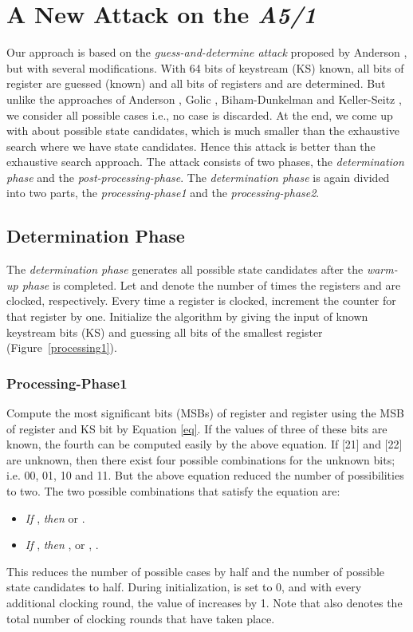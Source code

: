 \documentclass{llncs}
\begin{document}
\section{A New Attack on the \emph{A5/1}}
Our approach is based on the \emph{guess-and-determine attack} proposed by Anderson \cite{[And]}, but with several modifications. With 64 bits of keystream (KS) known, all bits of register  are guessed (known) and all bits of registers  and  are determined. But unlike the approaches of Anderson \cite{[And]}, Golic \cite{[Golic]}, Biham-Dunkelman \cite{[BD]} and Keller-Seitz \cite{[KS01]}, we consider all possible cases i.e., no case is discarded. At the end, we come up with about  possible state candidates, which is much smaller than the exhaustive search where we have  state candidates. Hence this attack is better than the exhaustive search approach. \newline\newline The attack consists of two phases, the \emph{determination phase} and the \emph{post-processing-phase}. The \emph{determination phase} is again divided into two parts, the \emph{processing-phase1} and the \emph{processing-phase2}.

\subsection{Determination Phase} 
The \emph{determination phase} generates all possible state candidates after the \emph{warm-up phase} \cite{[Bri]} is completed. 
Let  and  denote the number of times the registers  and  are clocked, respectively. Every time a register is clocked, increment the counter for that register by one. Initialize the algorithm by giving the input of known keystream bits (KS) and guessing all bits of the smallest register  (Figure~\ref{processing1}).

\subsubsection{Processing-Phase1} Compute the most significant bits (MSBs) of register  and register  using the MSB of register  and KS bit by Equation \ref{eq}.
If the values of three of these bits are known, the fourth can be computed easily by the above equation. If [21] and [22] are unknown, then there exist four possible combinations for the unknown bits; i.e. 00, 01, 10 and 11. But the above equation reduced the number of possibilities to two. The two possible combinations that satisfy the equation are: 
\begin{itemize}
\item \emph{If} , \emph{then}  or .
\item \emph{If} , \emph{then} ,  or , .
\end{itemize} 
This reduces the number of possible cases by half and the number of possible state candidates to half. During initialization,  is set to 0, and with every additional clocking round, the value of  increases by 1. Note that  also denotes the total number of clocking rounds that have taken place. 
\end{document}
